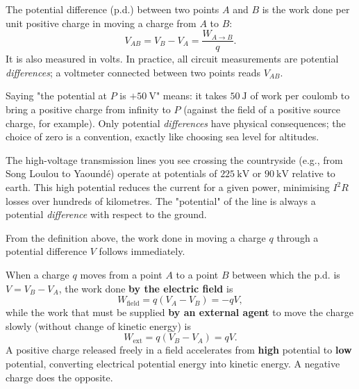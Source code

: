 \documentclass[11pt]{article}
\newcommand{\cle}[1]{{\popxbold\color{popdark}#1}}
\newcounter{popsec}
\newcounter{popsub}
\newcommand{\courssub}[1]{%
  \stepcounter{popsub}%
  \par\vspace{9pt}\noindent{\popxbold\fontsize{11.5}{13}\selectfont\color{popink}{\color{poporange}\thepopsec.\thepopsub}\hspace{6pt}#1}\par\nopagebreak\vspace{4pt}
}
\begin{document}
\begin{definition}
The \cle{potential difference} (p.d.) between two points $A$ and $B$ is the work done per unit positive charge in moving a charge from $A$ to $B$:
\[
V_{AB} = V_B - V_A = \frac{W_{A\to B}}{q}.
\]
It is also measured in volts. In practice, all circuit measurements are potential \emph{differences}; a voltmeter connected between two points reads $V_{AB}$.
\end{definition}

\begin{attention}
Saying "the potential at $P$ is $+50\ \mathrm{V}$" means: it takes $50\ \mathrm{J}$ of work per coulomb to bring a positive charge from infinity to $P$ (against the field of a positive source charge, for example). Only potential \emph{differences} have physical consequences; the choice of zero is a convention, exactly like choosing sea level for altitudes.
\end{attention}

\begin{savaistu}
The high-voltage transmission lines you see crossing the countryside (e.g., from Song Loulou to Yaoundé) operate at potentials of $225\ \mathrm{kV}$ or $90\ \mathrm{kV}$ relative to earth. This high potential reduces the current for a given power, minimising $I^2R$ losses over hundreds of kilometres. The "potential" of the line is always a potential \emph{difference} with respect to the ground.
\end{savaistu}

\courssub{Work done in moving a charge: $W = qV$}

From the definition above, the work done in moving a charge $q$ through a potential difference $V$ follows immediately.

\begin{propriete}
When a charge $q$ moves from a point $A$ to a point $B$ between which the p.d. is $V = V_B - V_A$, the work done \textbf{by the electric field} is
\[
W_{\text{field}} = q(V_A - V_B) = -qV,
\]
while the work that must be supplied \textbf{by an external agent} to move the charge slowly (without change of kinetic energy) is
\[
W_{\text{ext}} = q(V_B - V_A) = qV.
\]
A positive charge released freely in a field accelerates from \textbf{high} potential to \textbf{low} potential, converting electrical potential energy into kinetic energy. A negative charge does the opposite.
\end{propriete}
\end{document}
